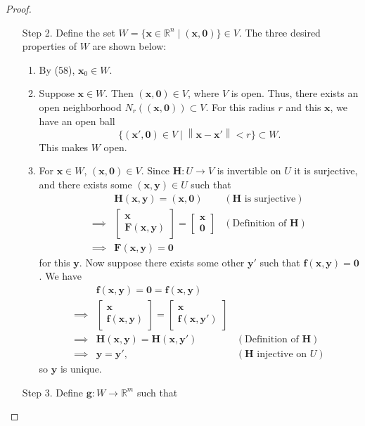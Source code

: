 \documentclass{article}
\newcommand{\R}{\mathbb{R}}
\newcommand{\x}{\mathbf{x}}
\newcommand{\F}{\mathbf{F}}
\newcommand{\f}{\mathbf{f}}
\newcommand{\y}{\mathbf{y}}
\newcommand{\ze}{\mathbf{0}}
\newcommand{\norm}[1]{\left\lVert#1\right\rVert}
\theoremstyle{definition}
\begin{document}
\begin{proof}
\begin{enumerate}
			\item[Step 2.]  Define the set $ W =\{\x\in\R^n\mid (\x,\ze)\}\in V $. The three desired properties of $ W $ are shown below:
			\begin{enumerate}
				\item By (58), $ \x_0\in W $. 
				\item Suppose $ \x \in W $. Then $ (\x,\ze)\in V $, where $ V $ is open. Thus, there exists an open neighborhood $ N_r((\x,\ze)) \subset V$. For this radius $ r $ and this $ \x $, we have an open ball $$ \{(\x',\ze) \in V \mid \norm{\x - \x'} < r\}\subset W .$$ This makes $ W $ open.  
				\item For $ \x\in W $, $ (\x,\ze)\in V $. Since $ \mathbf H:U\to V $ is invertible on $ U $ it is surjective, and there exists some $ (\x,\y)\in U $ such that 
				\begin{align*}
					&\mathbf H(\x,\y) = (\x,\ze) & (\mathbf H \text{ is surjective})\\
					\implies & \begin{bmatrix} \x \\ \F(\x,\y) \end{bmatrix}  = \begin{bmatrix}
						\x \\ \ze 
					\end{bmatrix} & (\text{Definition of } \mathbf H)\\
					\implies & \F(\x,\y) = \ze
				\end{align*}
				for this $ \y $. Now suppose there exists some other $ \y' $ such that $ \f(\x,\y)=\ze $. We have 
				\begin{align*}
					&	\f(\x,\y)=\ze=\f(\x,\y)\\
					\implies & \begin{bmatrix}
						\x \\ \f(\x,\y)
					\end{bmatrix} = \begin{bmatrix}
						\x \\ \f(\x,\y')
					\end{bmatrix}\\ 
					\implies & \mathbf H(\x,\y) = \mathbf H(\x,\y')& (\text{Definition of } \mathbf H)\\
					\implies & \y = \y', & (\mathbf H \text{ injective on }U ) 
				\end{align*}
				so $ \y $ is unique. 
			\end{enumerate}
			\item [Step 3.] Define $ \mathbf g:W\to\R^m $ such that 

\end{enumerate}
\end{proof}
\end{document}
